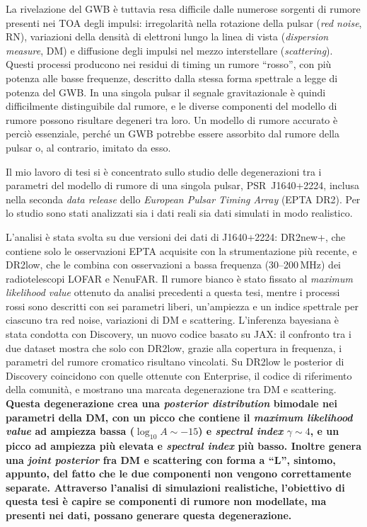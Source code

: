 \documentclass[12pt]{report}
\newcommand{\irene}[1]{{\color{blue}\bfseries #1}}
\begin{document}
La rivelazione del GWB è tuttavia resa difficile dalle numerose sorgenti di rumore
presenti nei TOA degli impulsi: irregolarità nella rotazione della pulsar
(\textit{red noise}, RN), variazioni della densità di elettroni lungo la linea di
vista (\textit{dispersion measure}, DM) e diffusione degli impulsi nel mezzo
interstellare (\textit{scattering}). Questi processi producono nei residui di
timing un rumore ``rosso'', con più potenza alle basse frequenze, descritto dalla
stessa forma spettrale a legge di potenza del GWB. In una singola pulsar il
segnale gravitazionale è quindi difficilmente distinguibile dal rumore, e le
diverse componenti del modello di rumore possono risultare degeneri tra loro.
Un modello di rumore accurato è perciò essenziale, perché un GWB potrebbe essere
assorbito dal rumore della pulsar o, al contrario, imitato da esso. \par

Il mio lavoro di tesi si è concentrato sullo studio delle degenerazioni tra i
parametri del modello di rumore di una singola pulsar, PSR~J1640+2224, inclusa
nella seconda \textit{data release} dello \textit{European Pulsar Timing Array}
(EPTA DR2). Per lo studio sono stati analizzati sia i dati reali sia dati simulati
in modo realistico. \par

L'analisi è stata svolta su due versioni dei dati di J1640+2224: DR2new+, che
contiene solo le osservazioni EPTA acquisite con la strumentazione più recente,
e DR2low, che le combina con osservazioni a bassa frequenza (30--200\,MHz) dei
radiotelescopi LOFAR e NenuFAR. Il rumore bianco è stato fissato al
\textit{maximum likelihood value} ottenuto da analisi precedenti a questa tesi,
mentre i processi rossi sono descritti con sei parametri liberi, un'ampiezza e un
indice spettrale per ciascuno tra red noise, variazioni di DM e scattering.
L'inferenza bayesiana è stata condotta con Discovery, un nuovo codice basato su
JAX: il confronto tra i due dataset mostra che solo con DR2low, grazie alla
copertura in frequenza, i parametri del rumore cromatico risultano vincolati. Su
DR2low le posterior di Discovery coincidono con quelle ottenute con Enterprise, il
codice di riferimento della comunità, e mostrano una marcata degenerazione tra DM
e scattering. \irene{Questa degenerazione crea una \textit{posterior distribution}
bimodale nei parametri della DM, con un picco che contiene il \textit{maximum
likelihood value} ad ampiezza bassa ($\log_{10}A \sim -15$) e \textit{spectral
index} $\gamma \sim 4$, e un picco ad ampiezza più elevata e \textit{spectral
index} più basso. Inoltre genera una \textit{joint posterior} fra DM e scattering
con forma a ``L'', sintomo, appunto, del fatto che le due componenti non vengono
correttamente separate. Attraverso l'analisi di simulazioni realistiche,
l'obiettivo di questa tesi è capire se componenti di rumore non modellate, ma
presenti nei dati, possano generare questa degenerazione.} \par
\end{document}
